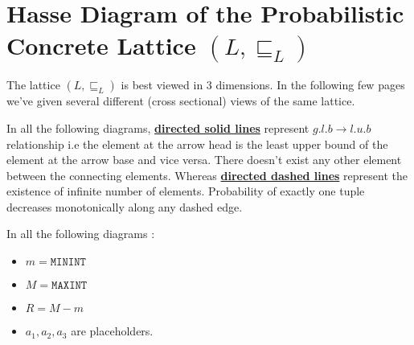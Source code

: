 \documentclass[final,3p, review, times]{util/elsarticle}
\begin{document}
\newpage
\section{\\Hasse Diagram of the Probabilistic Concrete Lattice $(L,\sqsubseteq_L)$}
\label{app:concrete_hasse}

The lattice $(L,\sqsubseteq_L)$ is best viewed in 3 dimensions. In the following few pages we've given several different (cross sectional) views of the same lattice.

In all the following diagrams, \underline{\textbf{directed solid lines}} represent $g.l.b\to l.u.b$ relationship i.e the element at the arrow head is the least upper bound of the element at the arrow base and vice versa. There doesn't exist any other element between the connecting elements. Whereas \underline{\textbf{directed dashed lines}} represent the existence of infinite number of elements. Probability of exactly one tuple decreases monotonically along any dashed edge.

In all the following diagrams :
\begin{itemize}
  \item $m=\mathtt{MININT}$
  \item $M=\mathtt{MAXINT}$
  \item $R=M-m$
  \item $a_1,a_2,a_3$ are placeholders.
\end{itemize}
\end{document}
